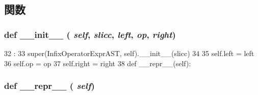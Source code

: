 \subsection{関数}
\hypertarget{classslicc_1_1ast_1_1OperatorExprAST_1_1InfixOperatorExprAST_ac775ee34451fdfa742b318538164070e}{
\subsubsection[{\_\-\_\-init\_\-\_\-}]{\setlength{\rightskip}{0pt plus 5cm}def \_\-\_\-init\_\-\_\- ( {\em self}, \/   {\em slicc}, \/   {\em left}, \/   {\em op}, \/   {\em right})}}
\label{classslicc_1_1ast_1_1OperatorExprAST_1_1InfixOperatorExprAST_ac775ee34451fdfa742b318538164070e}



\begin{DoxyCode}
32                                               :
33         super(InfixOperatorExprAST, self).__init__(slicc)
34 
35         self.left = left
36         self.op = op
37         self.right = right
38 
    def __repr__(self):
\end{DoxyCode}
\hypertarget{classslicc_1_1ast_1_1OperatorExprAST_1_1InfixOperatorExprAST_ad8b9328939df072e4740cd9a63189744}{
\subsubsection[{\_\-\_\-repr\_\-\_\-}]{\setlength{\rightskip}{0pt plus 5cm}def \_\-\_\-repr\_\-\_\- ( {\em self})}}
\label{classslicc_1_1ast_1_1OperatorExprAST_1_1InfixOperatorExprAST_ad8b9328939df072e4740cd9a63189744}



